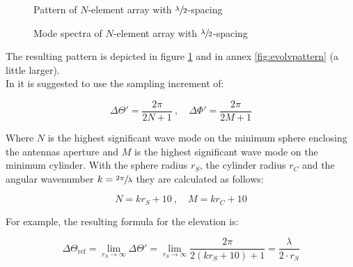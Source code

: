 \begin{figure}[h]
  \centering
  \centering
  \centering
\caption{Pattern of $N$-element array with $\sfrac{\lambda}{2}$-spacing}
\label{fig:evolvpattern2}
\end{figure}

\begin{figure}[h]
  \centering
  \centering
  \centering
\caption{Mode spectra of $N$-element array with $\sfrac{\lambda}{2}$-spacing}
\label{fig:evolvpattern3}
\end{figure}

The resulting pattern is depicted in figure \ref{fig:evolvpattern2} and in annex \ref{fig:evolvpattern} (a little larger).\\
In \cite{hansen} it is suggested to use the sampling increment of:

\begin{equation}
\Delta\Theta' = \frac{2\pi}{2N+1}\ , \quad \Delta\Phi'=\frac{2\pi}{2M+1}
\end{equation}

Where $N$ is the highest significant wave mode on the minimum sphere enclosing the antennas aperture and $M$ is the highest significant wave mode on the minimum cylinder. With the sphere radius $r_S$, the cylinder radius $r_C$ and the angular wavenumber $k = \sfrac{2\pi}{\lambda}$ they are calculated as follows:

\begin{equation}
N = kr_S+10\ , \quad M = kr_C+10
\end{equation}

For example, the resulting formula for the elevation is:

\begin{equation}
\Delta\Theta_{\text{ref}} = \lim_{r_S \to \infty}\Delta\Theta' = \lim_{r_S \to \infty} \frac{2\pi}{2\left(kr_S+10\right)+1} = \frac{\lambda}{2\cdot r_S}
\end{equation}


